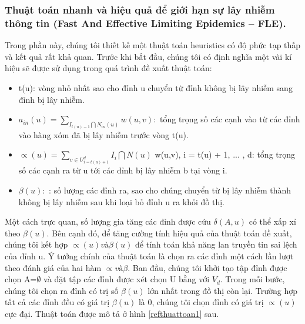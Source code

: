  		\subsubsection{Thuật toán nhanh và hiệu quả để giới hạn sự lây nhiễm thông tin (Fast And Effective Limiting Epidemics – FLE).}
 		Trong phần này, chúng tôi thiết kế một thuật toán heuristics có độ phức tạp thấp và kết quả rất khả quan. Trước khi bắt đầu, chúng tôi có định nghĩa một vài kí hiệu sẽ được sử dụng trong quá trình đề xuất thuật toán:
 		\begin {itemize}
 			\item t(u): vòng nhỏ nhất sao cho đỉnh u chuyển từ đỉnh không bị lây nhiễm sang đỉnh bị lây nhiễm.
 		
 			\item $a_{in}(u) = \sum_{I_{t(u) - 1} \bigcap N_{in}(u)} w(u,v):$ tổng trọng số các cạnh vào từ các đỉnh vào hàng xóm đã bị lây nhiễm trước vòng t(u).
 		
 			\item $\propto(u) = \sum_{v \in U^{d}_{i=t(u)+1}} I_{i} \bigcap N(u)$ w(u,v), i = t(u) + 1, ... , d: tổng trọng số các cạnh ra từ u tới các đỉnh bị lây nhiễm b tại vòng i.
 		
			\item $\beta(u): $ : số lượng các đỉnh ra, sao cho chúng chuyển từ bị lây nhiễm thành không bị lây nhiễm sau khi loại bỏ đỉnh u ra khỏi đồ thị.
		\end {itemize}
		Một cách trực quan, số lượng gia tăng các đỉnh được cứu $\delta(A, u)$ có thể xấp xỉ theo $\beta(u)$. Bên cạnh đó, để tăng cường tính hiệu quả của thuật toán đề xuất, chúng tôi kết hợp $\propto(u) và \beta(u)$ để tính toán khả năng lan truyền tin sai lệch của đỉnh u. Ý tưởng chính của thuật toán là chọn ra các đỉnh một cách lần lượt theo đánh giá của hai hàm $\propto và \beta$. Ban đầu, chúng tôi khởi tạo tập đỉnh được chọn A=$\emptyset$ và đặt tập các đỉnh được xét chọn U bằng với $V_{d}$. Trong mỗi bước, chúng tôi chọn ra đỉnh có trị số $\beta(u)$ lớn nhất trong đồ thị còn lại. Trường hợp tất cả các đỉnh đều có giá trị $\beta(u)$ là 0, chúng tôi chọn đỉnh có giá trị $\propto(u)$ cực đại. Thuật toán được mô tả ở hình \ref{refthuattoan1} sau.

